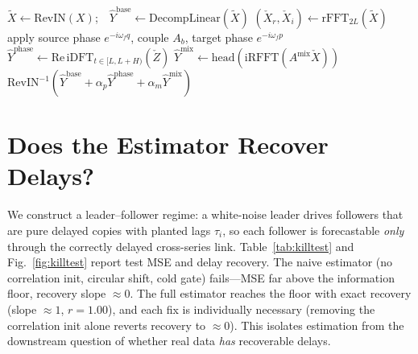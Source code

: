 \documentclass[journal,a4paper]{IEEEtran}
\begin{document}
\begin{algorithm}[t]
\caption{CSLL hybrid forward pass}\label{alg:csll}
\begin{algorithmic}[1]
\State $\tilde X\gets\mathrm{RevIN}(X)$;\ \ $\hat Y^{\text{base}}\gets\mathrm{DecompLinear}(\tilde X)$
\State $(\check X_r,\check X_i)\gets\mathrm{rFFT}_{2L}(\tilde X)$
 
  \State apply source phase $e^{-i\omega_f q}$, couple $A_b$, target phase $e^{-i\omega_f p}$
\EndFor
\State $\hat Y^{\text{phase}}\gets\mathrm{Re}\,\mathrm{iDFT}_{t\in[L,L+H)}(\check Z)$ 
\State $\hat Y^{\text{mix}}\gets\mathrm{head}(\mathrm{iRFFT}(A^{\text{mix}}\check X))$
\State \Return $\mathrm{RevIN}^{-1}(\hat Y^{\text{base}}+\alpha_p\hat Y^{\text{phase}}+\alpha_m\hat Y^{\text{mix}})$
\end{algorithmic}
\end{algorithm}

\section{Does the Estimator Recover Delays?}
\label{sec:killtest}
We construct a leader--follower regime: a white-noise leader drives followers that are pure
delayed copies with planted lags $\tau_i$, so each follower is forecastable \emph{only} through the
correctly delayed cross-series link. Table~\ref{tab:killtest} and Fig.~\ref{fig:killtest} report
test MSE and delay recovery. The naive estimator (no correlation init, circular shift, cold gate)
fails---MSE far above the information floor, recovery slope ${\approx}0$. The full estimator reaches
the floor with exact recovery (slope ${\approx}1$, $r=1.00$), and each fix is individually
necessary (removing the correlation init alone reverts recovery to ${\approx}0$). This isolates
estimation from the downstream question of whether real data \emph{has} recoverable delays.

\begin{table}[t]\centering\small
\caption{Kill-test (leader--follower, planted delays): the v2 estimator recovers delays exactly;
ablating any fix breaks it.}
\label{tab:killtest}
\end{table}
\end{document}
